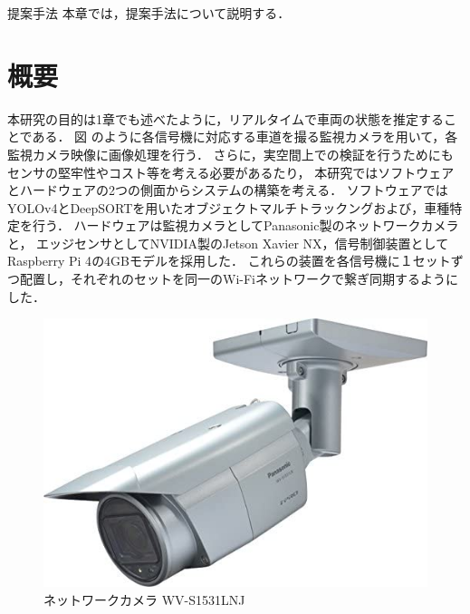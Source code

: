 \chapterhead
{提案手法}
{本章では，提案手法について説明する．}


\section{概要}
本研究の目的は1章でも述べたように，リアルタイムで車両の状態を推定することである．%
図 のように各信号機に対応する車道を撮る監視カメラを用いて，各監視カメラ映像に画像処理を行う．%
さらに，実空間上での検証を行うためにもセンサの堅牢性やコスト等を考える必要があるたり，
本研究ではソフトウェアとハードウェアの2つの側面からシステムの構築を考える．
ソフトウェアではYOLOv4とDeepSORTを用いたオブジェクトマルチトラックングおよび，車種特定を行う．
ハードウェアは監視カメラとしてPanasonic製のネットワークカメラ\cite{wv_s1531lnj}と，
エッジセンサとしてNVIDIA製のJetson Xavier NX\cite{jetson}，信号制御装置としてRaspberry Pi 4\cite{raspi}の4GBモデルを採用した．
これらの装置を各信号機に１セットずつ配置し，それぞれのセットを同一のWi-Fiネットワークで繋ぎ同期するようにした．

\begin{figure}[h]
    \includegraphics*[bb=0 0 950 700, width=1\linewidth]{./images/networkcamera.jpg}
    \caption{ネットワークカメラ WV-S1531LNJ} 
    \label{tab:networkcamera}
  \end{figure}

